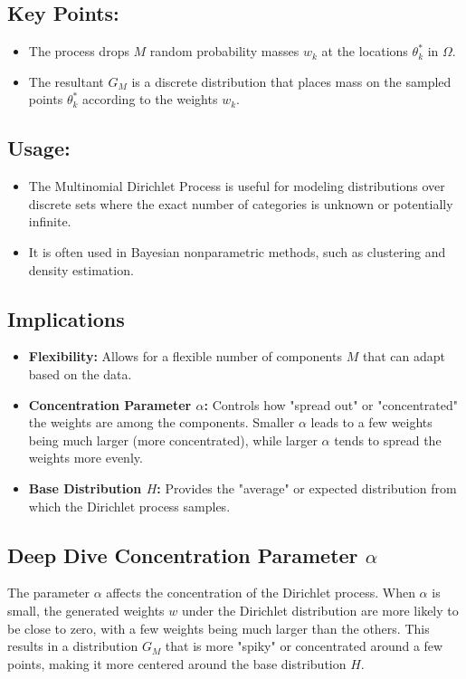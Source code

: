 \documentclass[10pt]{article}
\begin{document}
\subsection*{Key Points:}

\begin{itemize}
  \item The process drops \( M \) random probability masses \( w_k \) at the locations \( \theta_k^* \) in \( \Omega \).
  \item The resultant \( G_M \) is a discrete distribution that places mass on the sampled points \( \theta_k^* \) according to the weights \( w_k \).
\end{itemize}

\subsection*{Usage:}

\begin{itemize}
  \item The Multinomial Dirichlet Process is useful for modeling distributions over discrete sets where the exact number of categories is unknown or potentially infinite.
  \item It is often used in Bayesian nonparametric methods, such as clustering and density estimation.
\end{itemize}

\subsection*{Implications}
\begin{itemize}
  \item \textbf{Flexibility:} Allows for a flexible number of components \( M \) that can adapt based on the data.
  \item \textbf{Concentration Parameter \( \alpha \):} Controls how "spread out" or "concentrated" the weights are among the components. Smaller \( \alpha \) leads to a few weights being much larger (more concentrated), while larger \( \alpha \) tends to spread the weights more evenly.
  \item \textbf{Base Distribution \( H \):} Provides the "average" or expected distribution from which the Dirichlet process samples.
\end{itemize}



\subsection*{Deep Dive Concentration Parameter \( \alpha \)}
The parameter \( \alpha \) affects the concentration of the Dirichlet process. When \( \alpha \) is small, the generated weights \( w \) under the Dirichlet distribution are more likely to be close to zero, with a few weights being much larger than the others. This results in a distribution \( G_M \) that is more "spiky" or concentrated around a few points, making it more centered around the base distribution \( H \).
\end{document}

